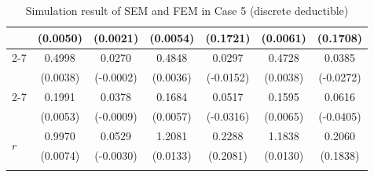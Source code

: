 \begin{table}[!ht]
{{\begin{minipage}{0.65\textwidth}
\begin{tabular}{lcccccc}
         & (0.0050) & (0.0021) & (0.0054) & (0.1721) & (0.0061) & (0.1708) \\
        \cmidrule{2-7}
         & 0.4998 & 0.0270 & 0.4848 & 0.0297 & 0.4728 & 0.0385 \\
         & (0.0038) & (-0.0002) & (0.0036) & (-0.0152) & (0.0038) & (-0.0272) \\
        \cmidrule{2-7}
         & 0.1991 & 0.0378 & 0.1684 & 0.0517 & 0.1595 & 0.0616 \\
         & (0.0053) & (-0.0009) & (0.0057) & (-0.0316) & (0.0065) & (-0.0405) \\
        \midrule
        \multirow{2}{*}{$r$} & 0.9970 & 0.0529 & 1.2081 & 0.2288 & 1.1838 & 0.2060 \\
         & (0.0074) & (-0.0030) & (0.0133) & (0.2081) & (0.0130) & (0.1838) \\
        \hhline{=======}
        \end{tabular}
    \end{minipage}
}
}
\caption{Simulation result of SEM and FEM in Case 5 (discrete deductible)}\label{tab:AppSimExoCase5}
\end{table}
